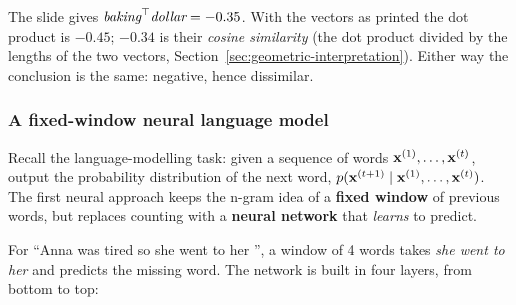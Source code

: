 \begin{nbwarning}
The slide gives $\textit{baking}^{\top}\textit{dollar} = -0.35$. With the vectors as printed
the dot product is $-0.45$; $-0.34$ is their \emph{cosine similarity} (the dot product
divided by the lengths of the two vectors, Section~\ref{sec:geometric-interpretation}).
Either way the conclusion is the same: negative, hence dissimilar.
\end{nbwarning}

\subsubsection{A fixed-window neural language model}

Recall the language-modelling task: given a sequence of words
$\mathbf{x}^{(1)}, \ldots, \mathbf{x}^{(t)}$, output the probability distribution of the next
word, $p(\mathbf{x}^{(t+1)} \mid \mathbf{x}^{(1)}, \ldots, \mathbf{x}^{(t)})$. The first neural
approach keeps the n-gram idea of a \textbf{fixed window} of previous words, but
replaces counting with a \textbf{neural network} that \emph{learns} to predict.

For ``Anna was tired so she went to her \underline{\quad}'', a window of 4 words
takes \emph{she went to her} and predicts the missing word. The network is built in
four layers, from bottom to top:

